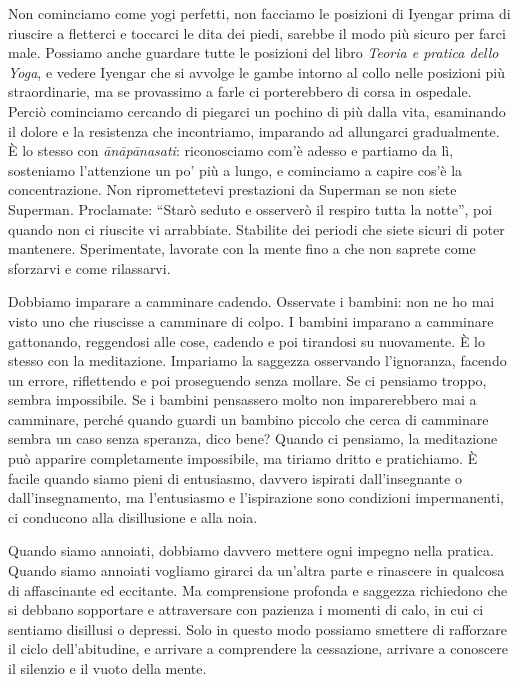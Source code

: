 Non cominciamo come yogi perfetti, non facciamo le posizioni di Iyengar
prima di riuscire a fletterci e toccarci le dita dei piedi, sarebbe il
modo più sicuro per farci male. Possiamo anche guardare tutte le
posizioni del libro \emph{Teoria e pratica dello Yoga}, e vedere Iyengar
che si avvolge le gambe intorno al collo nelle posizioni più
straordinarie, ma se provassimo a farle ci porterebbero di corsa in
ospedale. Perciò cominciamo cercando di piegarci un pochino di più dalla
vita, esaminando il dolore e la resistenza che incontriamo, imparando ad
allungarci gradualmente. È lo stesso con \emph{ānāpānasati}:
riconosciamo com'è adesso e partiamo da lì, sosteniamo l'attenzione un
po' più a lungo, e cominciamo a capire cos'è la concentrazione. Non
ripromettetevi prestazioni da Superman se non siete Superman.
Proclamate: ``Starò seduto e osserverò il respiro tutta la notte'', poi
quando non ci riuscite vi arrabbiate. Stabilite dei periodi che siete
sicuri di poter mantenere. Sperimentate, lavorate con la mente fino a
che non saprete come sforzarvi e come rilassarvi.

Dobbiamo imparare a camminare cadendo. Osservate i bambini: non ne ho
mai visto uno che riuscisse a camminare di colpo. I bambini imparano a
camminare gattonando, reggendosi alle cose, cadendo e poi tirandosi su
nuovamente. È lo stesso con la meditazione. Impariamo la saggezza
osservando l'ignoranza, facendo un errore, riflettendo e poi proseguendo
senza mollare. Se ci pensiamo troppo, sembra impossibile. Se i bambini
pensassero molto non imparerebbero mai a camminare, perché quando guardi
un bambino piccolo che cerca di camminare sembra un caso senza speranza,
dico bene? Quando ci pensiamo, la meditazione può apparire completamente
impossibile, ma tiriamo dritto e pratichiamo. È facile quando siamo
pieni di entusiasmo, davvero ispirati dall'insegnante o
dall'insegnamento, ma l'entusiasmo e l'ispirazione sono condizioni
impermanenti, ci conducono alla disillusione e alla noia.

Quando siamo annoiati, dobbiamo davvero mettere ogni impegno nella
pratica. Quando siamo annoiati vogliamo girarci da un'altra parte e
rinascere in qualcosa di affascinante ed eccitante. Ma comprensione
profonda e saggezza richiedono che si debbano sopportare e attraversare
con pazienza i momenti di calo, in cui ci sentiamo disillusi o depressi.
Solo in questo modo possiamo smettere di rafforzare il ciclo
dell'abitudine, e arrivare a comprendere la cessazione, arrivare a
conoscere il silenzio e il vuoto della mente.

